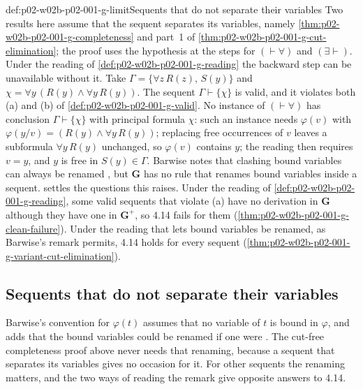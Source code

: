 \begin{hbwarning}{def:p02-w02b-p02-001-g-limit}{Sequents that do not separate their variables}
Two results here assume that the sequent separates its variables, namely
\cref{thm:p02-w02b-p02-001-g-completeness} and part~1 of
\cref{thm:p02-w02b-p02-001-g-cut-elimination}; the proof uses the
hypothesis at the steps for
\((\vdash\forall)\) and \((\exists\vdash)\).  Under the reading of
\cref{def:p02-w02b-p02-001-g-reading} the backward step can be unavailable
without it.  Take \(\Gamma=\{\forall z\,R(z),\,S(y)\}\) and
\(\chi=\forall y\,(R(y)\land\forall y\,R(y))\).  The sequent
\(\Gamma\vdash\{\chi\}\) is valid, and it violates both (a) and (b) of
\cref{def:p02-w02b-p02-001-g-valid}.  No instance of \((\vdash\forall)\) has
conclusion \(\Gamma\vdash\{\chi\}\) with principal formula \(\chi\): such
an instance needs \(\varphi(v)\) with
\(\varphi(y/v)=(R(y)\land\forall y\,R(y))\); replacing free occurrences of
\(v\) leaves a subformula \(\forall y\,R(y)\) unchanged, so \(\varphi(v)\)
contains \(y\); the reading then requires \(v=y\), and \(y\) is free in
\(S(y)\in\Gamma\).  Barwise notes that clashing bound variables can always
be renamed \cite[ch.~A.1, \S3, p.~22]{Barwise1977FirstOrder}, but
\(\mathbf G\) has no rule that renames bound variables inside a sequent.
 settles the questions this raises.
Under the reading of \cref{def:p02-w02b-p02-001-g-reading}, some valid
sequents that violate (a) have no derivation in \(\mathbf G\) although they
have one in \(\mathbf G^{+}\), so 4.14 fails for them
(\cref{thm:p02-w02b-p02-001-g-clean-failure}).  Under the reading that lets
bound variables be renamed, as Barwise's remark permits, 4.14 holds for
every sequent (\cref{thm:p02-w02b-p02-001-g-variant-cut-elimination}).
\end{hbwarning}

\subsection{Sequents that do not separate their variables}
\label{sec:p02-w02b-p02-001-g-variants}

Barwise's convention for \(\varphi(t)\) assumes that no variable of \(t\) is
bound in \(\varphi\), and adds that the bound variables could be renamed if
one were \cite[ch.~A.1, \S3, p.~22]{Barwise1977FirstOrder}.  The cut-free
completeness proof above never needs that renaming, because a sequent that
separates its variables gives no occasion for it.  For other sequents the
renaming matters, and the two ways of reading the remark give opposite
answers to 4.14.

